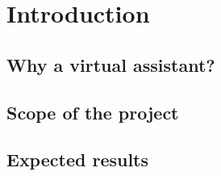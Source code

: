 \chapter{Introduction}

\section{Why a virtual assistant?}

\section{Scope of the project}

\section{Expected results}
